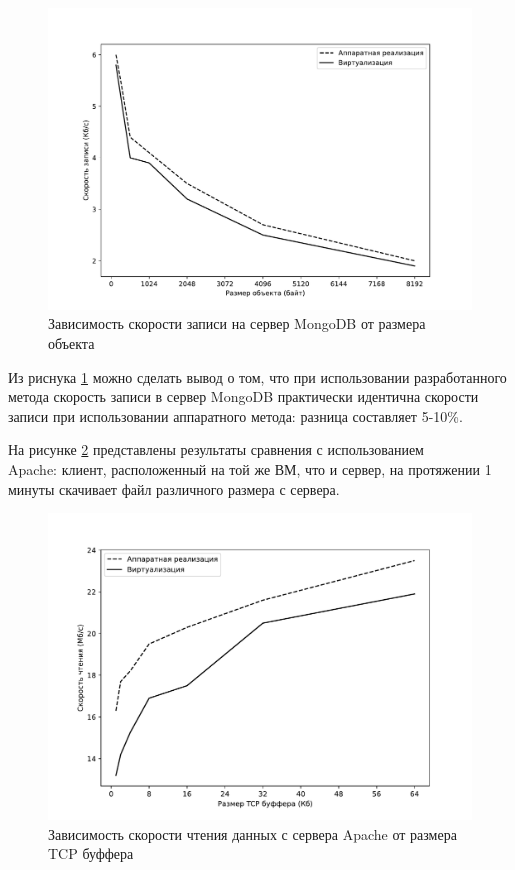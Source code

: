 \begin{figure}[h]
	\centering
	\includegraphics[width=\textwidth]{img/system-1.pdf}
	\caption{Зависимость скорости записи на сервер MongoDB от размера объекта}
	\label{fig:system-1}
\end{figure}

Из риснука \ref{fig:system-1} можно сделать вывод о том, что при использовании разработанного метода скорость записи в сервер MongoDB практически идентична скорости записи при использовании аппаратного метода: разница составляет 5-10\%.

На рисунке \ref{fig:system-2} представлены результаты сравнения с использованием\\Apache: клиент, расположенный на той же ВМ, что и сервер, на протяжении 1 минуты скачивает файл различного размера с сервера.

\begin{figure}[h]
	\centering
	\includegraphics[width=\textwidth]{img/system-2.pdf}
	\caption{Зависимость скорости чтения данных с сервера Apache от размера TCP буффера}
	\label{fig:system-2}
\end{figure}


